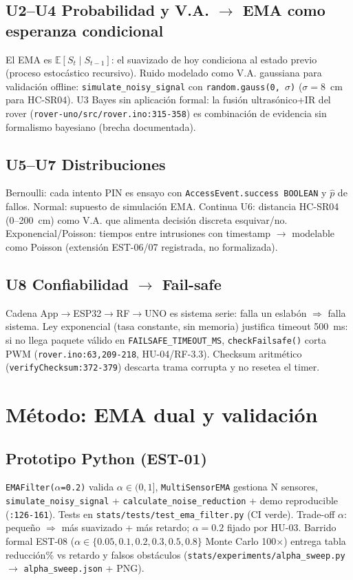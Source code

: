\documentclass[conference]{IEEEtran}
\begin{document}
\subsection{U2--U4 Probabilidad y V.A. $\rightarrow$ EMA como esperanza condicional}
El EMA es $\mathbb{E}[S_t\mid S_{t-1}]$: el suavizado de hoy condiciona al estado previo (proceso estocástico recursivo). Ruido modelado como V.A. gaussiana para validación offline: \texttt{simulate\_noisy\_signal} con \texttt{random.gauss(0,\,$\sigma$)} ($\sigma=8$~cm para HC-SR04). U3 Bayes sin aplicación formal: la fusión ultrasónico+IR del rover (\texttt{rover-uno/src/rover.ino:315-358}) es combinación de evidencia sin formalismo bayesiano (brecha documentada).

\subsection{U5--U7 Distribuciones}
Bernoulli: cada intento PIN es ensayo con \texttt{AccessEvent.success BOOLEAN} y $\hat p$ de fallos. Normal: supuesto de simulación EMA. Continua U6: distancia HC-SR04 (0--200~cm) como V.A. que alimenta decisión discreta esquivar/no. Exponencial/Poisson: tiempos entre intrusiones con timestamp $\rightarrow$ modelable como Poisson (extensión EST-06/07 registrada, no formalizada).

\subsection{U8 Confiabilidad $\rightarrow$ Fail-safe}
Cadena App$\rightarrow$ESP32$\rightarrow$RF$\rightarrow$UNO es sistema serie: falla un eslabón $\Rightarrow$ falla sistema. Ley exponencial (tasa constante, sin memoria) justifica timeout 500~ms: si no llega paquete válido en \texttt{FAILSAFE\_TIMEOUT\_MS}, \texttt{checkFailsafe()} corta PWM (\texttt{rover.ino:63,209-218}, HU-04/RF-3.3). Checksum aritmético (\texttt{verifyChecksum:372-379}) descarta trama corrupta y no resetea el timer.

\section{Método: EMA dual y validación}
\subsection{Prototipo Python (EST-01)}
\texttt{EMAFilter($\alpha$=0.2)} valida $\alpha\in(0,1]$, \texttt{MultiSensorEMA} gestiona N sensores, \texttt{simulate\_noisy\_signal} + \texttt{calculate\_noise\_reduction} + demo reproducible (\texttt{:126-161}). Tests en \texttt{stats/tests/test\_ema\_filter.py} (CI verde). Trade-off $\alpha$: pequeño $\Rightarrow$ más suavizado + más retardo; $\alpha=0.2$ fijado por HU-03. Barrido formal EST-08 ($\alpha\in\{0.05,0.1,0.2,0.3,0.5,0.8\}$ Monte Carlo 100$\times$) entrega tabla reducción\% vs retardo y falsos obstáculos
(\texttt{stats/experiments/alpha\_sweep.py} $\rightarrow$ \texttt{alpha\_sweep.json} + PNG).
\end{document}
